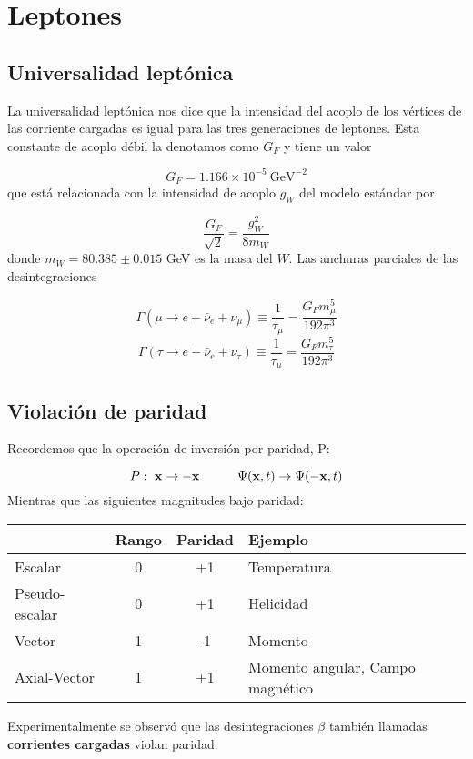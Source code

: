 \chapter{Leptones}

\section{Universalidad leptónica}

La universalidad leptónica nos dice que la intensidad del acoplo de los vértices de las corriente cargadas es igual para las tres generaciones de leptones. Esta constante de acoplo débil la denotamos como $G_F$ y tiene un valor

\begin{equation}
	G_F = 1.166 \times 10^{-5} \ \text{GeV}^{-2}
\end{equation}
que está relacionada con la intensidad de acoplo $g_W$ del modelo estándar por

\begin{equation}
	\frac{G_F}{\sqrt{2}} = \frac{g^2_W}{8m_W}
\end{equation}
donde $m_W=80.385 \pm 0.015$ GeV es la masa del $W$. Las anchuras parciales de las desintegraciones

\begin{equation}
	\Gamma (\mu \rightarrow e + \bar{\nu}_e + \nu_\mu) \equiv \frac{1}{\tau_\mu} = \frac{G_F m_\mu^5}{192 \pi^3}
\end{equation}
\begin{equation}
\Gamma (\tau \rightarrow e + \bar{\nu}_e + \nu_\tau) \equiv \frac{1}{\tau_\mu} = \frac{G_F m_\tau^5}{192 \pi^3}
\end{equation}

\section{Violación de paridad}

Recordemos que la operación de inversión por paridad, P:

\begin{equation}
	P: \ \mathbf{x} \rightarrow -\mathbf{x} \quad \quad \quad \Psi (\mathbf{x},t) \rightarrow \Psi (-\mathbf{x},t)
\end{equation}
Mientras que las siguientes magnitudes bajo paridad:
 
\begin{table} \centering
	\begin{tabular}{l|ccl}
		& Rango & Paridad & Ejemplo \\ \hline
		Escalar & 0 & +1 & Temperatura \\
		Pseudo-escalar & 0 & +1 & Helicidad \\
		Vector & 1 & -1 & Momento \\
		Axial-Vector & 1 & +1 & Momento angular, Campo magnético \\
	\end{tabular}
\end{table}
Experimentalmente se observó que las desintegraciones $\beta$ también llamadas \textbf{corrientes cargadas} violan paridad.

